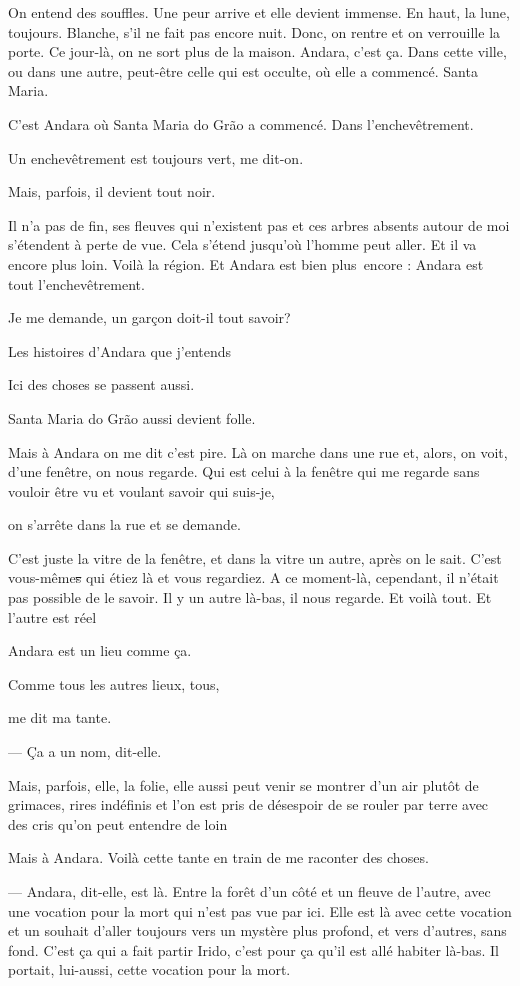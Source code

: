 On entend des souffles. Une peur arrive et elle devient immense. En
haut, la lune, toujours. Blanche, s'il ne fait pas encore nuit. Donc, on
rentre et on verrouille la porte. Ce jour-là, on ne sort plus de la
maison. Andara, c'est ça. Dans cette ville, ou dans une autre, peut-être
celle qui est occulte, où elle a commencé. Santa Maria.

C'est Andara où Santa Maria do Grão a commencé. Dans l'enchevêtrement.

Un enchevêtrement est toujours vert, me dit-on.

Mais, parfois, il devient tout noir.

Il n'a pas de fin, ses fleuves qui n'existent pas et ces arbres absents
autour de moi s'étendent à perte de vue. Cela s'étend jusqu'où l'homme
peut aller. Et il va encore plus loin. Voilà la région. Et Andara est
bien plus~encore : Andara est tout l'enchevêtrement.

Je me demande, un garçon doit-il tout savoir?

Les histoires d'Andara que j'entends

Ici des choses se passent aussi.

Santa Maria do Grão aussi devient folle.

Mais à Andara on me dit c'est pire. Là on marche dans une rue et, alors,
on voit, d'une fenêtre, on nous regarde. Qui est celui à la fenêtre qui
me regarde sans vouloir être vu et voulant savoir qui suis-je,

on s'arrête dans la rue et se demande.

C'est juste la vitre de la fenêtre, et dans la vitre un autre, après on
le sait. C'est vous-même\sout{s} qui étiez là et vous regardiez. A ce
moment-là, cependant, il n'était pas possible de le savoir. Il y un
autre là-bas, il nous regarde. Et voilà tout. Et l'autre est réel

Andara est un lieu comme ça.

Comme tous les autres lieux, tous,

me dit ma tante.

--- Ça a un nom, dit-elle.

 Mais, parfois, elle, la folie, elle aussi peut venir se montrer d'un air
plutôt de grimaces, rires indéfinis et l'on est pris de désespoir de se
rouler par terre avec des cris qu'on peut entendre de loin

Mais à Andara. Voilà cette tante en train de me raconter des choses.

--- Andara, dit-elle, est là. Entre la forêt d'un côté et un fleuve de
  l'autre, avec une vocation pour la mort qui n'est pas vue par ici.
  Elle est là avec cette vocation et un souhait d'aller toujours vers un
  mystère plus profond, et vers d'autres, sans fond. C'est ça qui a fait
  partir Irido, c'est pour ça qu'il est allé habiter là-bas. Il portait,
  lui-aussi, cette vocation pour la mort.

